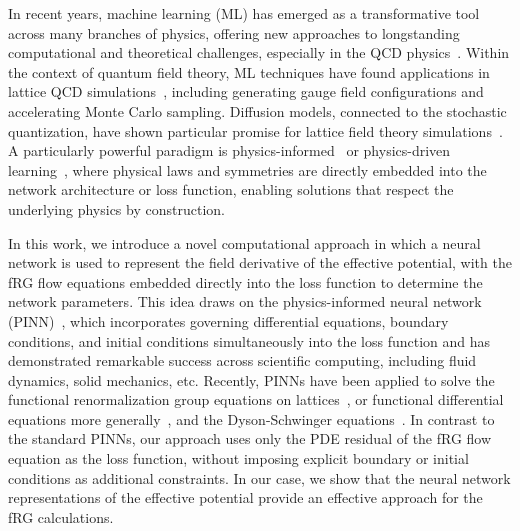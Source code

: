 \documentclass[reprint,twocolumn,superscriptaddress,preprintnumbers,amsmath,amssymb,aps,prd,floatfix]{revtex4-2}
\begin{document}
In recent years, machine learning (ML) has emerged as a transformative tool across many branches of physics, offering new approaches to longstanding computational and theoretical challenges, especially in the QCD physics~\cite{Boehnlein:2021eym,Zhou:2023pti,Aarts:2025gyp}. Within the context of quantum field theory, ML techniques have found applications in lattice QCD simulations~\cite{Boyda:2022nmh,Cranmer:2023xbe,Aarts:2025gyp}, including generating gauge field configurations and accelerating Monte Carlo sampling. Diffusion models, connected to the stochastic quantization, have shown particular promise for lattice field theory simulations~\cite{Wang:2023exq,Wang:2023sry,Zhu:2024kiu,Zhu:2025pmw,Aarts:2026zzr}. A particularly powerful paradigm is physics-informed~\cite{RAISSI2019686,Karniadakis2021} or physics-driven learning~\cite{Aarts:2025gyp}, where physical laws and symmetries are directly embedded into the network architecture or loss function, enabling solutions that respect the underlying physics by construction.

In this work, we introduce a novel computational approach in which a neural network is used to represent the field derivative of the effective potential, with the fRG flow equations embedded directly into the loss function to determine the network parameters. This idea draws on the physics-informed neural network (PINN)~\cite{RAISSI2019686,Karniadakis2021}, which incorporates governing differential equations, boundary conditions, and initial conditions simultaneously into the loss function and has demonstrated remarkable success across scientific computing, including fluid dynamics, solid mechanics, etc. Recently, PINNs have been applied to solve the functional renormalization group equations on lattices~\cite{Yokota:2023czk}, or functional differential equations more generally~\cite{Miyagawa:2024yrw}, and the Dyson-Schwinger equations~\cite{Terin:2024iyy,CarmoTerin:2025pvs}. In contrast to the standard PINNs, our approach uses only the PDE residual of the fRG flow equation as the loss function, without imposing explicit boundary or initial conditions as additional constraints. In our case, we show that the neural network representations of the effective potential provide an effective approach for the fRG calculations.
\end{document}
